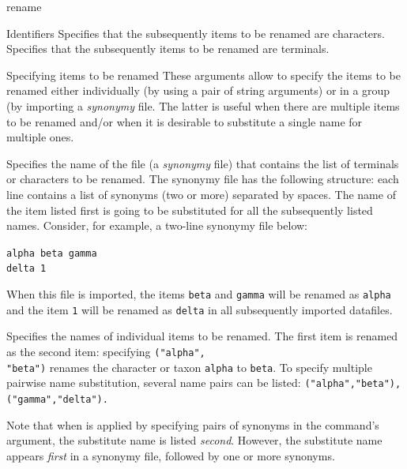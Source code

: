 \begin{command}{rename}{}
\begin{arguments}
\begin{argumentgroup}{Identifiers}
                {Specifies that the subsequently items to be renamed are characters.} 
                {}
                {Specifies that the subsequently items to be renamed are terminals.} 
                {}
		\end{argumentgroup}
	      
	      \begin{argumentgroup}{Specifying items to be renamed}
	      {These arguments allow to specify the items to be renamed either individually (by 
	      using a pair of string arguments) or in a group (by importing a \emph{synonymy} file.
	      The latter is useful when there are multiple items to be renamed and/or when it is
	      desirable to substitute a single name for  multiple ones.}
	      
                {Specifies the name of the file (a \emph{synonymy} file) that contains the list of
                terminals or characters to be renamed. The synonymy file has the following structure:
                each line contains a list of synonyms (two or more) separated by spaces. The name of the
                item listed first is going to be substituted for all the subsequently listed names. Consider,
                for example, a two-line synonymy file below:
                
                \texttt{alpha beta gamma \\
                delta 1\\}
                 
                 When this file is imported, the items \texttt{beta} and \texttt{gamma} will be
                 renamed as \texttt{alpha} and the item \texttt{1} will be renamed as \texttt{delta}
                 in all subsequently imported datafiles.}
                {}
                {Specifies the names of individual items to be renamed. The first item is renamed
                as the second item: specifying \texttt{("alpha",\\"beta")} renames the character or taxon
                \texttt{alpha} to \texttt{beta}. To specify multiple pairwise name substitution, several 
                name pairs can be listed: \texttt{("alpha","beta"),("gamma","delta").}}
                {}
                
                \begin{statement}
                Note that when  is applied by specifying pairs of
                 synonyms in the command's argument,
                the substitute name is listed \emph{second}. However,  the substitute name 
                appears \emph{first} in a synonymy file, followed by one or more synonyms.
                \end{statement}
	      \end{argumentgroup}
	      

\end{arguments}
\end{command}
